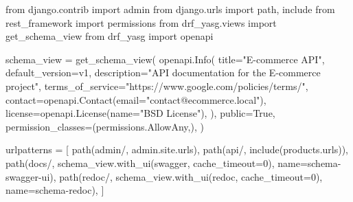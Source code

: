 \documentclass[
  a4paper,
  DIV=11,
  numbers=noendperiod,
  onepage,
  openany]{scrreprt}
\newenvironment{Shaded}{\begin{snugshade}}{\end{snugshade}}
\newcommand{\DecValTok}[1]{\textcolor[rgb]{0.68,0.00,0.00}{#1}}
\newcommand{\ImportTok}[1]{\textcolor[rgb]{0.00,0.46,0.62}{#1}}
\newcommand{\NormalTok}[1]{\textcolor[rgb]{0.00,0.23,0.31}{#1}}
\newcommand{\OperatorTok}[1]{\textcolor[rgb]{0.37,0.37,0.37}{#1}}
\newcommand{\StringTok}[1]{\textcolor[rgb]{0.13,0.47,0.30}{#1}}
\newcommand{\VariableTok}[1]{\textcolor[rgb]{0.07,0.07,0.07}{#1}}
\begin{document}
\begin{Shaded}
\begin{Highlighting}[]
\ImportTok{from}\NormalTok{ django.contrib }\ImportTok{import}\NormalTok{ admin}
\ImportTok{from}\NormalTok{ django.urls }\ImportTok{import}\NormalTok{ path, include}
\ImportTok{from}\NormalTok{ rest\_framework }\ImportTok{import}\NormalTok{ permissions}
\ImportTok{from}\NormalTok{ drf\_yasg.views }\ImportTok{import}\NormalTok{ get\_schema\_view}
\ImportTok{from}\NormalTok{ drf\_yasg }\ImportTok{import}\NormalTok{ openapi}

\NormalTok{schema\_view }\OperatorTok{=}\NormalTok{ get\_schema\_view(}
\NormalTok{    openapi.Info(}
\NormalTok{        title}\OperatorTok{=}\StringTok{"E{-}commerce API"}\NormalTok{,}
\NormalTok{        default\_version}\OperatorTok{=}\StringTok{\textquotesingle{}v1\textquotesingle{}}\NormalTok{,}
\NormalTok{        description}\OperatorTok{=}\StringTok{"API documentation for the E{-}commerce project"}\NormalTok{,}
\NormalTok{        terms\_of\_service}\OperatorTok{=}\StringTok{"https://www.google.com/policies/terms/"}\NormalTok{,}
\NormalTok{        contact}\OperatorTok{=}\NormalTok{openapi.Contact(email}\OperatorTok{=}\StringTok{"contact@ecommerce.local"}\NormalTok{),}
\NormalTok{        license}\OperatorTok{=}\NormalTok{openapi.License(name}\OperatorTok{=}\StringTok{"BSD License"}\NormalTok{),}
\NormalTok{    ),}
\NormalTok{    public}\OperatorTok{=}\VariableTok{True}\NormalTok{,}
\NormalTok{    permission\_classes}\OperatorTok{=}\NormalTok{(permissions.AllowAny,),}
\NormalTok{)}

\NormalTok{urlpatterns }\OperatorTok{=}\NormalTok{ [}
\NormalTok{    path(}\StringTok{\textquotesingle{}admin/\textquotesingle{}}\NormalTok{, admin.site.urls),}
\NormalTok{    path(}\StringTok{\textquotesingle{}api/\textquotesingle{}}\NormalTok{, include(}\StringTok{\textquotesingle{}products.urls\textquotesingle{}}\NormalTok{)),}
\NormalTok{    path(}\StringTok{\textquotesingle{}docs/\textquotesingle{}}\NormalTok{, schema\_view.with\_ui(}\StringTok{\textquotesingle{}swagger\textquotesingle{}}\NormalTok{, cache\_timeout}\OperatorTok{=}\DecValTok{0}\NormalTok{), name}\OperatorTok{=}\StringTok{\textquotesingle{}schema{-}swagger{-}ui\textquotesingle{}}\NormalTok{),}
\NormalTok{    path(}\StringTok{\textquotesingle{}redoc/\textquotesingle{}}\NormalTok{, schema\_view.with\_ui(}\StringTok{\textquotesingle{}redoc\textquotesingle{}}\NormalTok{, cache\_timeout}\OperatorTok{=}\DecValTok{0}\NormalTok{), name}\OperatorTok{=}\StringTok{\textquotesingle{}schema{-}redoc\textquotesingle{}}\NormalTok{),}
\NormalTok{]}
\end{Highlighting}
\end{Shaded}
\end{document}

